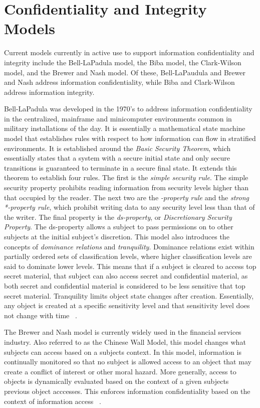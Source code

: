 \section{Confidentiality and Integrity Models}
Current models currently in active use to support information confidentiality and integrity include the Bell-LaPadula model, the Biba model,  the Clark-Wilson model, and the Brewer and Nash model.  Of these, Bell-LaPaudula and Brewer and Nash address information confidentiality, while Biba and Clark-Wilson address information integrity.

Bell-LaPadula was developed in the 1970's to address information confidentiality in the centralized, mainframe and minicomputer environments  common in military installations of the day.  It is essentially a mathematical state machine model that establishes rules with respect to how information can flow in stratified environments.  It is established around the {\it Basic Security Theorem}, which essentially states that a system with a secure initial state and only secure transitions is guaranteed to terminate in a secure final state.  It extends this theorem to establish four rules.  The first is the {\it simple security rule}.  The simple security property prohibits reading information from security levels higher than that occupied by the reader.  The next two are the {\it *-property rule} and the {\it strong *-property rule}, which prohibit writing data to any security level less than that of the writer.  The final property is the {\it ds-property}, or {\it Discretionary Security Property}.  The ds-property allows a subject to pass permissions on to other subjects at the initial subject's discretion.  This model also introduces the concepts of {\it dominance relations} and {\it tranquility}.  Dominance relations exist within partially ordered sets of classification levels, where higher classification levels are said to dominate lower levels.  This means that if a subject is cleared to access top secret material, that subject can also access secret and confidential material, as both secret and confidential material is considered to be less sensitive that top secret material.  Tranquility limits object state changes after creation.  Essentially, any object is created at a specific sensitivity level and that sensitivity level does not change with time ~\cite{Bell1973}.

The Brewer and Nash model is currently widely used in the financial services industry.  Also referred to as the Chinese Wall Model, this model changes what subjects can access based on a subjects context.  In this model, information is continually monitored so that no subject is allowed access to an object that may create a conflict of interest or other moral hazard.  More generally, access to objects is dynamically evaluated based on the context of a given subjects previous object acccesses. This enforces information confidentiality based on the context of information access ~\cite{Brewer89}.

